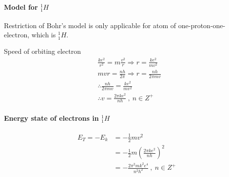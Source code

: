         \paragraph{Model for $_1^1 H$}
            Restriction of Bohr's model is only applicable for atom of one-proton-one-electron, which is $_1^1 H$.


            Speed of orbiting electron
            \begin{align}
                & \frac{k e^2}{r^2} = m \frac{v^2}{r} \Rightarrow r = \frac{k e^2}{m v^2} \\
                & m v r = \frac{n h}{2 \pi} \Rightarrow r = \frac{n h}{2 \pi m v} \\
                & \therefore \frac{n h}{2 \pi m v} = \frac{k e^2}{m v^2} \\
                & \therefore v = \frac{2 \pi k e^2}{n h} \ , \ n \in Z^+
            \end{align}


        
        \paragraph{Energy state of electrons in $_1^1 H$}
            \begin{align}
                E_T = - E_k &= - \frac{1}{2} m v^2 \\
                            &= - \frac{1}{2} m (\frac{2 \pi k e^2}{n h})^2 \\
                            &= - \frac{2 \pi^2 m k^2 e^4}{n^2 h^2} \ , \ n \in Z^+
                \label{eqn_ele_ene_stat}
            \end{align}

